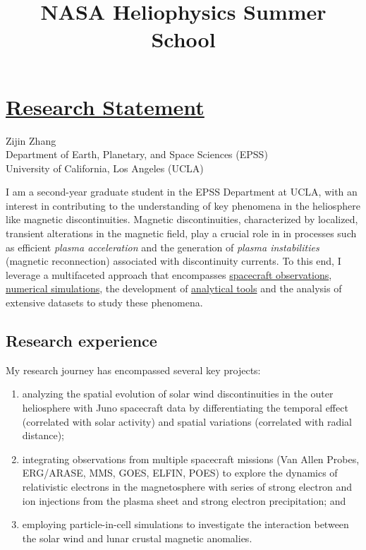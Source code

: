 \documentclass[
  letterpaper,
  DIV=11,
  numbers=noendperiod]{scrartcl}
\title{NASA Heliophysics Summer School}
\author{}
\date{}
\begin{document}
\maketitle

\newpage{}

\section{\texorpdfstring{\ul{Research
Statement}}{Research Statement}}\label{research-statement}

Zijin Zhang\\
Department of Earth, Planetary, and Space Sciences (EPSS)\\
University of California, Los Angeles (UCLA)

I am a second-year graduate student in the EPSS Department at UCLA, with
an interest in contributing to the understanding of key phenomena in the
heliosphere like magnetic discontinuities. Magnetic discontinuities,
characterized by localized, transient alterations in the magnetic field,
play a crucial role in in processes such as efficient \emph{plasma
acceleration} and the generation of \emph{plasma instabilities}
(magnetic reconnection) associated with discontinuity currents. To this
end, I leverage a multifaceted approach that encompasses
\href{https://beforerr.github.io/ids_spatial_evolution_juno/_manuscript/}{spacecraft
observations},
\href{https://beforerr.github.io/ion_scattering_by_SWD/}{numerical
simulations}, the development of
\href{https://beforerr.github.io/discontinuitypy/}{analytical tools} and
the analysis of extensive datasets to study these phenomena.

\subsection{Research experience}\label{research-experience}

My research journey has encompassed several key projects:

\begin{enumerate}
\def\labelenumi{\arabic{enumi}.}
\item
  analyzing the spatial evolution of solar wind discontinuities in the
  outer heliosphere with Juno spacecraft data by differentiating the
  temporal effect (correlated with solar activity) and spatial
  variations (correlated with radial distance);
\item
  integrating observations from multiple spacecraft missions (Van Allen
  Probes, ERG/ARASE, MMS, GOES, ELFIN, POES) to explore the dynamics of
  relativistic electrons in the magnetosphere with series of strong
  electron and ion injections from the plasma sheet and strong electron
  precipitation; and
\item
  employing particle-in-cell simulations to investigate the interaction
  between the solar wind and lunar crustal magnetic anomalies.
\end{enumerate}
\end{document}
